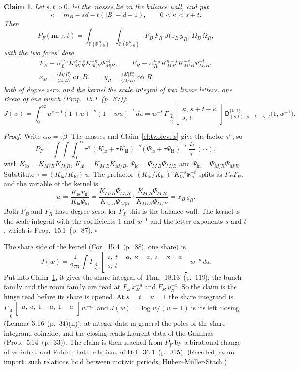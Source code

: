 \documentclass[11pt]{article}
\newcommand{\mvec}{\mathbf m}
\newcommand{\sB}{\mathsf B}
\newcommand{\Gst}[4]{\Gamma_{\substack{#1\\#2}}\!\begin{bmatrix}#3\\#4\end{bmatrix}}
\newcommand{\hb}[2]{#1~(p.~#2)}   %
\theoremstyle{plain}
\newtheorem{claim}{Claim}[section]
\theoremstyle{remark}
\begin{document}
\begin{claim}\label{cl:separation}
Let $s,t>0$, let the masses lie on the balance wall, and put
\[
\kappa=m_B-sd-t(|B|-d-1),\qquad 0<\kappa<s+t .
\]
Then
\[
P_F(\mvec;s,t)=\int_{\mathbb P(\mathbb R^B_{>0})}\int_{\mathbb P(\mathbb R^R_{>0})}F_B\,F_R\;J\big(x_B\,y_R\big)\;\Omega_B\,\Omega_R ,
\]
with the two faces' data
\begin{gather*}
F_B=\alpha_B^{m_B}K_{M/R}^{\kappa-s}K_{M|B}^{-\kappa}\Psi_{M|B}^{-t},\qquad F_R=\alpha_R^{m_R}K_{M|R}^{\kappa-s}K_{M/B}^{-\kappa}\Psi_{M/B}^{-t},\\
x_B=\frac{\langle M/R\rangle}{\langle M|B\rangle}\ \text{on }B,\qquad y_R=\frac{\langle M|R\rangle}{\langle M/B\rangle}\ \text{on }R,
\end{gather*}
both of degree zero, and the kernel the scale integral of two linear letters, one Breta of one bunch (Prop.~\hb{15.1}{87}):
\[
J(w)=\int_0^\infty u^{\kappa-1}(1+u)^{-s}(1+wu)^{-t}\,du=w^{-t}\,\Gst22{\kappa,\ s+t-\kappa}{s,\ t}\,\sB^{\{0,1\}}_{(s,t),\,s+t-\kappa;\,I}\big(1,w^{-1}\big).
\]
\end{claim}

\emph{Proof.} Write $\alpha_B=\tau\beta$. The masses and Claim~\ref{cl:twolevels} give the factor $\tau^{\kappa}$, so
\[
P_F=\int\!\!\int\int_0^\infty \tau^{\kappa}\,(K_{\mathrm{lo}}+\tau K_{\mathrm{hi}})^{-s}(\Psi_{\mathrm{lo}}+\tau\Psi_{\mathrm{hi}})^{-t}\,\frac{d\tau}\tau\,(\cdots),
\]
with $K_{\mathrm{lo}}=K_{M/R}K_{M|R}$, $K_{\mathrm{hi}}=K_{M|B}K_{M/B}$, $\Psi_{\mathrm{lo}}=\Psi_{M|B}\Psi_{M/B}$ and $\Psi_{\mathrm{hi}}=\Psi_{M/R}\Psi_{M|R}$. Substitute $\tau=(K_{\mathrm{lo}}/K_{\mathrm{hi}})\,u$. The prefactor $(K_{\mathrm{lo}}/K_{\mathrm{hi}})^\kappa K_{\mathrm{lo}}^{-s}\Psi_{\mathrm{lo}}^{-t}$ splits as $F_BF_R$, and the variable of the kernel is
\[
w=\frac{K_{\mathrm{lo}}\Psi_{\mathrm{hi}}}{K_{\mathrm{hi}}\Psi_{\mathrm{lo}}}=\frac{K_{M/R}\Psi_{M/R}}{K_{M|B}\Psi_{M|B}}\cdot\frac{K_{M|R}\Psi_{M|R}}{K_{M/B}\Psi_{M/B}}=x_B\,y_R .
\]
Both $F_B$ and $F_R$ have degree zero; for $F_R$ this is the balance wall. The kernel is the scale integral with the coefficients $1$ and $w^{-1}$ and the letter exponents $s$ and $t$, which is Prop.~\hb{15.1}{87}. $\square$

The share side of the kernel (Cor.~\hb{15.4}{88}, one share) is
\[
J(w)=\frac1{2\pi i}\int\Gst42{a,\ t-a,\ \kappa-a,\ s-\kappa+a}{s,\ t}\,w^{-a}\,da .
\]
Put into Claim~\ref{cl:separation}, it gives the share integral of Thm.~\hb{18.13}{119}: the bunch family and the room family are read at $F_B\,x_B^{-a}$ and $F_R\,y_R^{-a}$. So the claim is the hinge read before its share is opened. At $s=t=\kappa=1$ the share integrand is $\Gst40{a,\ a,\ 1-a,\ 1-a}{}\,w^{-a}$, and $J(w)=\log w/(w-1)$ is its left closing (Lemma~\hb{5.16}{34}(ii)); at integer data in general the poles of the share integrand coincide, and the closing reads Laurent data of the Gammas (Prop.~\hb{5.14}{33}). The claim is then reached from $P_F$ by a birational change of variables and Fubini, both relations of Def.~\hb{36.1}{315}. (Recalled, as an import: such relations hold between motivic periods, Huber--M\"uller-Stach.)
\end{document}
